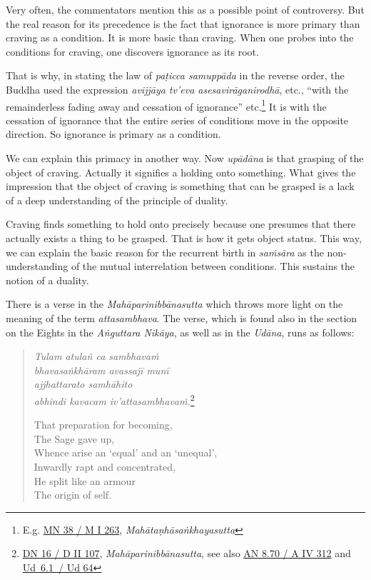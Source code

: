 Very often, the commentators mention this as a possible point of controversy. But the real reason for its precedence is the fact that ignorance is more primary than craving as a condition. It is more basic than craving. When one probes into the conditions for craving, one discovers ignorance as its root.

That is why, in stating the law of \emph{paṭicca samuppāda} in the reverse order, the Buddha used the expression \emph{avijjāya tv'eva asesavirāganirodhā}, etc., ``with the remainderless fading away and cessation of ignorance'' etc.\footnote{E.g. \href{https://suttacentral.net/mn38/pli/ms}{MN 38 / M I 263}, \emph{Mahātaṇhāsaṅkhayasutta}} It is with the cessation of ignorance that the entire series of conditions move in the opposite direction. So ignorance is primary as a condition.

We can explain this primacy in another way. Now \emph{upādāna} is that grasping of the object of craving. Actually it signifies a holding onto something. What gives the impression that the object of craving is something that can be grasped is a lack of a deep understanding of the principle of duality.

Craving finds something to hold onto precisely because one presumes that there actually exists a thing to be grasped. That is how it gets object status. This way, we can explain the basic reason for the recurrent birth in \emph{saṁsāra} as the non-understanding of the mutual interrelation between conditions. This sustains the notion of a duality.

There is a verse in the \emph{Mahāparinibbānasutta} which throws more light on the meaning of the term \emph{attasambhava}. The verse, which is found also in the section on the Eights in the \emph{Aṅguttara Nikāya}, as well as in the \emph{Udāna}, runs as follows:

\begin{quote}
\emph{Tulam atulañ ca sambhavaṁ}\\
\emph{bhavasaṅkhāram avassajī munī}\\
\emph{ajjhattarato samhāhito}\\
\emph{abhindi kavacam iv'attasambhavaṁ.}\footnote{\href{https://suttacentral.net/dn16/pli/ms}{DN 16 / D II 107}, \emph{Mahāparinibbānasutta}, see also \href{https://suttacentral.net/an8.70/pli/ms}{AN 8.70 / A IV 312} and \href{https://suttacentral.net/ud6.1/pli/ms}{Ud~6.1~/ Ud 64}}

That preparation for becoming,\\
The Sage gave up,\\
Whence arise an `equal' and an `unequal',\\
Inwardly rapt and concentrated,\\
He split like an armour\\
The origin of self.
\end{quote}

